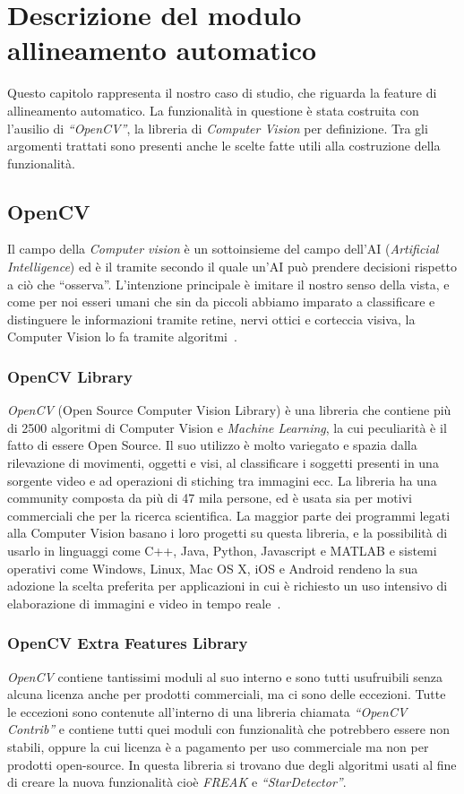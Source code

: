 \chapter{Descrizione del modulo allineamento automatico}
\label{chap:descriptionnewtool} 
\noindent Questo capitolo rappresenta il nostro caso di studio, che riguarda la feature di allineamento automatico. La funzionalità in questione è stata costruita con l'ausilio di \textit{``OpenCV''}, la libreria di \textit{Computer Vision} per definizione. Tra gli argomenti trattati sono presenti anche le scelte fatte utili alla costruzione della funzionalità.

\section{OpenCV}
\noindent Il campo della \textit{Computer vision} è un sottoinsieme del campo dell'AI (\textit{Artificial Intelligence}) ed è il tramite secondo il quale un'AI può prendere decisioni rispetto a ciò che ``osserva''. L'intenzione principale è imitare il nostro senso della vista, e come per noi esseri umani che sin da piccoli abbiamo imparato a classificare e distinguere le informazioni tramite retine, nervi ottici e corteccia visiva, la Computer Vision lo fa tramite algoritmi~\cite{IBM_CV}.

\subsection{OpenCV Library}
\noindent \textit{OpenCV} (Open Source Computer Vision Library) è una libreria che contiene più di 2500 algoritmi di Computer Vision e \textit{Machine Learning}, la cui peculiarità è il fatto di essere Open Source. Il suo utilizzo è molto variegato e spazia dalla rilevazione di movimenti, oggetti e visi, al classificare i soggetti presenti in una sorgente video e ad operazioni di stiching tra immagini ecc. La libreria ha una community composta da più di 47 mila persone, ed è usata sia per motivi commerciali che per la ricerca scientifica.
La maggior parte dei programmi legati alla Computer Vision basano i loro progetti su questa libreria, e la possibilità di usarlo in linguaggi come C++, Java, Python, Javascript e MATLAB e sistemi operativi come Windows, Linux, Mac OS X, iOS e Android rendeno la sua adozione la scelta preferita per applicazioni in cui è richiesto un uso intensivo di elaborazione di immagini e video in tempo reale~\cite{opencv_library}.

\subsection{OpenCV Extra Features Library}
\noindent \textit{OpenCV} contiene tantissimi moduli al suo interno e sono tutti usufruibili senza alcuna licenza anche per prodotti commerciali, ma ci sono delle eccezioni.
Tutte le eccezioni sono contenute all'interno di una libreria chiamata \textit{``OpenCV Contrib''} e contiene tutti quei moduli con funzionalità che potrebbero essere non stabili, oppure la cui licenza è a pagamento per uso commerciale ma non per prodotti open-source. In questa libreria si trovano due degli algoritmi usati al fine di creare la nuova funzionalità cioè \textit{FREAK} e \textit{``StarDetector''}.

